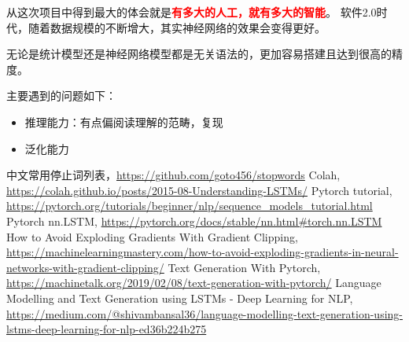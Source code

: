 \documentclass[logo,reportComp]{thesis}
\begin{document}
从这次项目中得到最大的体会就是\textcolor{red}{\textbf{有多大的人工，就有多大的智能}}。
软件2.0时代，随着数据规模的不断增大，其实神经网络的效果会变得更好。

无论是统计模型还是神经网络模型都是无关语法的，更加容易搭建且达到很高的精度。

主要遇到的问题如下：
\begin{itemize}
\item 推理能力：有点偏阅读理解的范畴，复现
\item 泛化能力
\end{itemize}

\begin{thebibliography}{99}
 中文常用停止词列表，\url{https://github.com/goto456/stopwords}
 Colah, \url{https://colah.github.io/posts/2015-08-Understanding-LSTMs/}
 Pytorch tutorial, \url{https://pytorch.org/tutorials/beginner/nlp/sequence_models_tutorial.html}
 Pytorch nn.LSTM, \url{https://pytorch.org/docs/stable/nn.html\#torch.nn.LSTM}
 How to Avoid Exploding Gradients With Gradient Clipping, \url{https://machinelearningmastery.com/how-to-avoid-exploding-gradients-in-neural-networks-with-gradient-clipping/}
 Text Generation With Pytorch, \url{https://machinetalk.org/2019/02/08/text-generation-with-pytorch/}
 Language Modelling and Text Generation using LSTMs - Deep Learning for NLP, \url{https://medium.com/@shivambansal36/language-modelling-text-generation-using-lstms-deep-learning-for-nlp-ed36b224b275}
\end{thebibliography}
\end{document}
